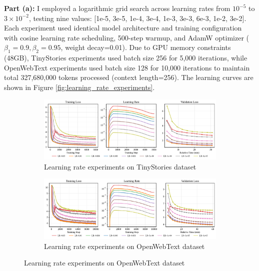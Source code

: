 \begin{answer}

\textbf{Part (a):}
I employed a logarithmic grid search across learning rates from $10^{-5}$ to $3 \times 10^{-2}$, testing nine values: [1e-5, 3e-5, 1e-4, 3e-4, 1e-3, 3e-3, 6e-3, 1e-2, 3e-2]. Each experiment used identical model architecture and training configuration with cosine learning rate scheduling, 500-step warmup, and AdamW optimizer ($\beta_1=0.9, \beta_2=0.95$, weight decay=0.01). Due to GPU memory constraints (48GB), TinyStories experiments used batch size 256 for 5,000 iterations, while OpenWebText experiments used batch size 128 for 10,000 iterations to maintain total 327,680,000 tokens processed (context length=256). The learning curves are shown in Figure \ref{fig:learning_rate_experiments}.

\begin{figure}[h]
    \centering
    \begin{subfigure}[t]{\textwidth}
        \centering
        \includegraphics[width=\textwidth]{images/ts_learning_rate_experiments.pdf}
        \vspace{-20pt} %
        \caption{Learning rate experiments on TinyStories dataset}
        \label{fig:ts_learning_rate_experiments}
    \end{subfigure}
        
    \begin{subfigure}[t]{\textwidth}
        \centering
        \includegraphics[width=\textwidth]{images/owt_learning_rate_experiments.pdf}
        \vspace{-20pt} %
        \caption{Learning rate experiments on OpenWebText dataset}
        \label{fig:owt_learning_rate_experiments}
    \end{subfigure}
    

\end{figure}
\end{answer}
